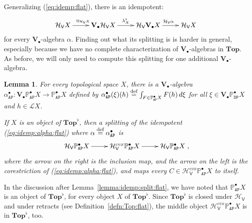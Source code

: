\documentclass[preprint,12pt]{elsarticle}
\newcommand\eqdef{\mathrel{\buildrel \text{def}\over=}}
\newcommand\Lform{\mathcal L}
\newcommand\Pred{\mathbb{P}}
\newcommand\Angel{{\mathtt{A}}}
\newcommand\Demon{{\mathtt{D}}}
\newcommand\Nature{{\mathtt{P}}}
\newcommand\AN{{\Angel\Nature}}
\newcommand\DN{{\Demon\Nature}}
\newcommand\Hoare{{\mathcal H}}
\newcommand\Vt{\mathsf{V}}
\newcommand\HV{\Hoare_\Vt}
\newcommand\Val{{\mathbf V}}
\newcommand\Topcat{\mathbf{Top}}
\newtheorem{lemma}[theorem]{Lemma}
\begin{document}
Generalizing (\ref{eq:idemp:flat}), there is an idempotent:
\begin{equation}
  \label{eq:idemp:alpha:flat}
  \xymatrix{
    \HV X \ar[r]^{\eta_{\HV X}}
    & \Val_\bullet {\HV X}
    \ar[r]^{\lambda^\flat_X}
    & \HV {\Val_\bullet X}
    \ar[r]^{\HV \alpha}
    & \HV X
  }
\end{equation}
for every $\Val_\bullet$-algebra $\alpha$.  Finding out what its
splitting is is harder in general, especially because we have no
complete characterization of $\Val_\bullet$-algebras in $\Topcat$.  As
before, we will only need to compute this splitting for one additional
$\Val_\bullet$-algebra.
\begin{lemma}
  \label{lemma:idemp:P:flat}
  For every topological space $X$, there is a $\Val_\bullet$-algebra
  $\alpha_\AN^\bullet \colon \Val_\bullet {\Pred_\AN^\bullet X} \to
  \Pred_\AN^\bullet X$ defined by
  $\alpha_\AN^\bullet (\xi) (h) \eqdef \int_{F \in \Pred_\AN^\bullet
    X} F (h) \,d\xi$ for all
  $\xi \in \Val_\bullet {\Pred_\DN^\bullet X}$ and $h \in \Lform X$.

  If $X$ is an object of $\Topcat^\flat$, then a splitting of the
  idempotent (\ref{eq:idemp:alpha:flat}) where
  $\alpha \eqdef \alpha_\AN^\bullet$ is
  \begin{align*}
    \xymatrix{\HV {\Pred_\AN^\bullet X} \ar[r]
    & \HV^{cvx} {\Pred_\AN^\bullet X} \ar[r]
    & \HV {\Pred_\AN^\bullet X}},
  \end{align*}
  where the arrow on the right is the inclusion map, and the arrow on
  the left is the corestriction of (\ref{eq:idemp:alpha:flat}), and
  maps every $C \in \HV^{cvx} {\Pred_\AN^\bullet X}$ to itself.
\end{lemma}
In the discussion after Lemma~\ref{lemma:idemp:split:flat}, we have
noted that $\Pred_\AN^\bullet X$ is an object of $\Topcat^\flat$, for
every object $X$ of $\Topcat^\flat$.  Since $\Topcat^\flat$ is closed
under $\HV$ and under retracts (see Definition~\ref{defn:Top:flat}),
the middle object $\HV^{cvx} {\Pred_\AN^\bullet X}$ is in
$\Topcat^\flat$, too.
\end{document}
